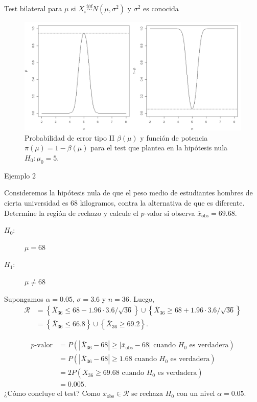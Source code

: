 \documentclass{beamer}
\theoremstyle{definition}
\begin{document}
\begin{frame}{\color{rosee}Test bilateral para $\mu$ si $X_i\stackrel{iid}{\sim}N(\mu,\sigma^2)$ y $\sigma^2$ es conocida}\small

  \begin{figure}
    \centering
    \includegraphics[height=.6\textheight]{img/power.png}
    \caption{Probabilidad de error tipo II $\beta(\mu)$ y función de potencia $\pi(\mu)=1-\beta(\mu)$ para el test que plantea en la hipótesis nula $H_0:\mu_{0}=5$.}
    \label{fig:potencia-2}
  \end{figure}
\end{frame}



\begin{frame}{\color{rosee}Ejemplo 2}\small
  
    Consideremos la hip\'otesis nula de que el peso medio de estudiantes
    hombres de cierta universidad es 68 kilogramos, contra la
    alternativa de que es diferente. Determine la región de rechazo y calcule el $p$-valor si observa $\overline{x}_{\text{obs}}= 69.68$.
    \begin{description}
    \item[$H_0$:] $\mu = 68$
    \item[$H_1$:] $\mu \neq 68$
    \end{description}
    Supongamos $\alpha = 0.05$, $\sigma = 3.6$ y $n=36$. Luego,
    \begin{align*}
      \mathcal R
      &=  \left\{\overline{X}_{36}\leq 68 - 1.96\cdot3.6/\sqrt{36}\right\} \cup
        \left\{\overline{X}_{36}\geq 68 + 1.96\cdot3.6/\sqrt{36}\right\} \\
      &= \left\{\overline{X}_{36}\leq 66.8 \right\} \cup
        \left\{\overline{X}_{36}\geq 69.2\right\}.
    \end{align*}
  

    \begin{align*}
      \text{$p$-valor}
      &= P(| \overline{X}_{36}- 68| \geq | \overline{x}_{\text{obs}} -68| \text{ cuando $H_0$ es verdadera} ) \\
      &= P(| \overline{X}_{36}- 68| \geq 1.68 \text{ cuando $H_0$ es verdadera})\\
      &= 2P(\overline{X}_{36}\geq 69.68 \text{ cuando $H_0$ es verdadera}) \\
      &= 0.005.
    \end{align*}
    ¿Cómo concluye el test? Como $\overline{x}_{\text{obs}}\in \mathcal{R}$ se rechaza $H_0$ con un nivel $\alpha=0.05$.

\end{frame}
\end{document}
